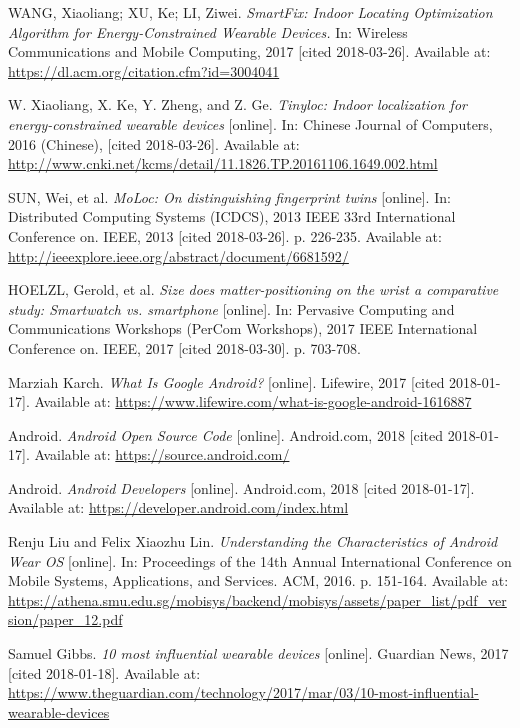 \begin{thebibliography}{10}
WANG, Xiaoliang; XU, Ke; LI, Ziwei. \textit{SmartFix: Indoor Locating Optimization Algorithm for Energy-Constrained Wearable Devices.} In: Wireless Communications and Mobile Computing, 2017 [cited 2018-03-26]. Available at: \url{https://dl.acm.org/citation.cfm?id=3004041}

W. Xiaoliang, X. Ke, Y. Zheng, and Z. Ge. \textit{Tinyloc: Indoor localization for energy-constrained wearable devices} [online]. In: Chinese Journal of Computers, 2016 (Chinese), [cited 2018-03-26]. Available at: \url{http://www.cnki.net/kcms/detail/11.1826.TP.20161106.1649.002.html}

SUN, Wei, et al. \textit{MoLoc: On distinguishing fingerprint twins} [online]. In: Distributed Computing Systems (ICDCS), 2013 IEEE 33rd International Conference on. IEEE, 2013 [cited 2018-03-26]. p. 226-235. Available at: \url{http://ieeexplore.ieee.org/abstract/document/6681592/}

HOELZL, Gerold, et al. \textit{Size does matter-positioning on the wrist a comparative study: Smartwatch vs. smartphone} [online]. In: Pervasive Computing and Communications Workshops (PerCom Workshops), 2017 IEEE International Conference on. IEEE, 2017 [cited 2018-03-30]. p. 703-708.

Marziah Karch. \textit{What Is Google Android?} [online]. Lifewire, 2017 [cited 2018-01-17]. Available at: \url{https://www.lifewire.com/what-is-google-android-1616887}

Android. \textit{Android Open Source Code} [online]. Android.com, 2018 [cited 2018-01-17]. Available at: \url{https://source.android.com/}

Android. \textit{Android Developers} [online]. Android.com, 2018 [cited 2018-01-17]. Available at: \url{https://developer.android.com/index.html}

Renju Liu and Felix Xiaozhu Lin. \textit{Understanding the Characteristics of Android Wear OS} [online]. In: Proceedings of the 14th Annual International Conference on Mobile Systems, Applications, and Services. ACM, 2016. p. 151-164. Available at: \url{https://athena.smu.edu.sg/mobisys/backend/mobisys/assets/paper_list/pdf_version/paper_12.pdf}

Samuel Gibbs. \textit{10 most influential wearable devices} [online]. Guardian News, 2017 [cited 2018-01-18]. Available at: \url{https://www.theguardian.com/technology/2017/mar/03/10-most-influential-wearable-devices}


\end{thebibliography}
